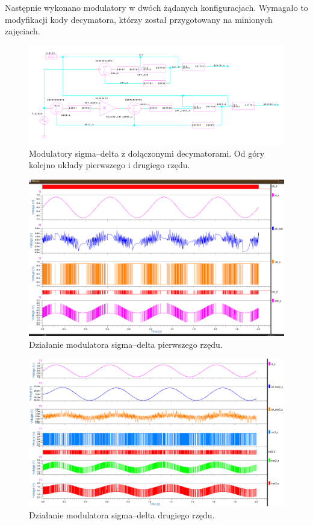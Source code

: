 \documentclass[13pt, a4paper, twoside]{mwart}
\begin{document}
Następnie wykonano modulatory w dwóch żądanych konfiguracjach. Wymagało to modyfikacji kody decymatora, którzy został przygotowany na minionych zajęciach.

\begin{figure}[H]
	\centering
  \includegraphics[width=0.9\linewidth]{inv/sigma_delta_2_sch.png}
  \caption{Modulatory sigma--delta z dołączonymi decymatorami. Od góry kolejno układy pierwszego i drugiego rzędu.}
\end{figure}



\begin{figure}[H]
	\centering
  \includegraphics[width=\linewidth]{inv/sigma_delta.png}
  \caption{Działanie modulatora sigma--delta pierwszego rzędu.}
\end{figure}

\begin{figure}[H]
	\centering
  \includegraphics[width=\linewidth]{inv/sigma_delta_2.png}
  \caption{Działanie modulatora sigma--delta drugiego rzędu.}
\end{figure}
\end{document}
